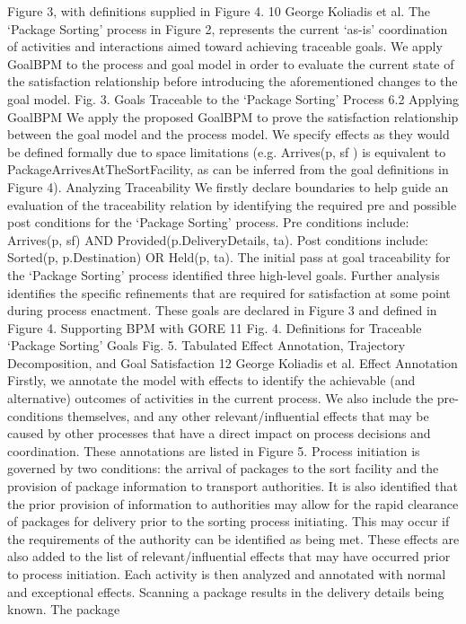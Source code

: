 Figure 3, with definitions supplied in Figure 4.
10 George Koliadis et al.
The ‘Package Sorting’ process in Figure 2, represents the current ‘as-is’ coordination of activities and interactions aimed toward achieving traceable goals.
We apply GoalBPM to the process and goal model in order to evaluate the current state of the satisfaction relationship before introducing the aforementioned
changes to the goal model.
Fig. 3. Goals Traceable to the ‘Package Sorting’ Process
6.2 Applying GoalBPM
We apply the proposed GoalBPM to prove the satisfaction relationship between
the goal model and the process model. We specify effects as they would be
defined formally due to space limitations (e.g. Arrives(p, sf ) is equivalent to
PackageArrivesAtTheSortFacility, as can be inferred from the goal definitions in
Figure 4).
Analyzing Traceability We firstly declare boundaries to help guide an evaluation of the traceability relation by identifying the required pre and possible post conditions for the ‘Package Sorting’ process. Pre conditions include:
Arrives(p, sf) AND Provided(p.DeliveryDetails, ta). Post conditions include:
Sorted(p, p.Destination) OR Held(p, ta).
The initial pass at goal traceability for the ‘Package Sorting’ process identified
three high-level goals. Further analysis identifies the specific refinements that are
required for satisfaction at some point during process enactment. These goals
are declared in Figure 3 and defined in Figure 4.
Supporting BPM with GORE 11
Fig. 4. Definitions for Traceable ‘Package Sorting’ Goals
Fig. 5. Tabulated Effect Annotation, Trajectory Decomposition, and Goal Satisfaction
12 George Koliadis et al.
Effect Annotation Firstly, we annotate the model with effects to identify the
achievable (and alternative) outcomes of activities in the current process. We also
include the pre-conditions themselves, and any other relevant/influential effects
that may be caused by other processes that have a direct impact on process
decisions and coordination. These annotations are listed in Figure 5.
Process initiation is governed by two conditions: the arrival of packages to the
sort facility and the provision of package information to transport authorities.
It is also identified that the prior provision of information to authorities may
allow for the rapid clearance of packages for delivery prior to the sorting process
initiating. This may occur if the requirements of the authority can be identified
as being met. These effects are also added to the list of relevant/influential effects
that may have occurred prior to process initiation.
Each activity is then analyzed and annotated with normal and exceptional effects. Scanning a package results in the delivery details being known. The package
